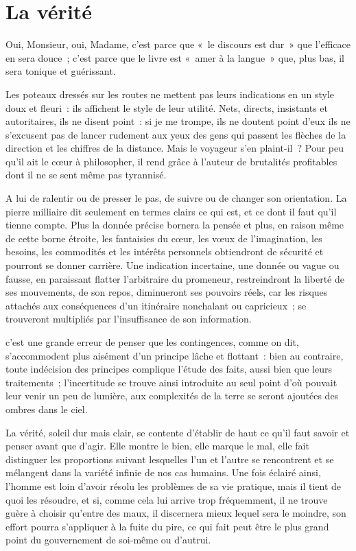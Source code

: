 \documentclass[french,twoside]{book} %
\begin{document}
\section[{La vérité}]{La vérité}
\noindent Oui, Monsieur, oui, Madame, c’est parce que « le discours est dur » que l’efficace en sera douce ; c’est parce que le livre est « amer à la langue » que, plus bas, il sera tonique et guérissant.\par
Les poteaux dressés sur les routes ne mettent pas leurs indications en un style doux et fleuri : ils affichent le style de leur utilité. Nets, directs, insistants et autoritaires, ils ne disent point : si je me trompe, ils ne doutent point d’eux ils ne s’excusent pas de lancer rudement aux yeux des gens qui passent les flèches de la direction et les chiffres de la distance. Mais le voyageur s’en plaint-il ? Pour peu qu’il ait le cœur à philosopher, il rend grâce à l’auteur de brutalités profitables dont il ne se sent même pas tyrannisé.\par
A lui de ralentir ou de presser le pas, de suivre ou de changer son orientation. La pierre milliaire dit seulement en termes clairs ce qui est, et ce dont il faut qu’il tienne compte. Plus la donnée précise bornera la pensée et plus, en raison même de cette borne étroite, les fantaisies du cœur, les vœux de l’imagination, les besoins, les commodités et les intérêts personnels obtiendront de sécurité et pourront se donner carrière. Une indication incertaine, une donnée ou vague ou fausse, en paraissant flatter l’arbitraire du promeneur, restreindront la liberté de ses mouvements, de son repos, diminueront ses pouvoirs réels, car les risques attachés aux conséquences d’un itinéraire nonchalant ou capricieux ; se trouveront multipliés par l’insuffisance de son information.\par
c’est une grande erreur de penser que les contingences, comme on dit, s’accommodent plus aisément d’un principe lâche et flottant : bien au contraire, toute indécision des principes complique l’étude des faits, aussi bien que leurs traitements ; l’incertitude se trouve ainsi introduite au seul point d’où pouvait leur venir un peu de lumière, aux complexités de la terre se seront ajoutées des ombres dans le ciel.\par
La vérité, soleil dur mais clair, se contente d’établir de haut ce qu’il faut savoir et penser avant que d’agir. Elle montre le bien, elle marque le mal, elle fait distinguer les proportions suivant lesquelles l’un et l’autre se rencontrent et se mélangent dans la variété infinie de nos cas humains. Une fois éclairé ainsi, l’homme est loin d’avoir résolu les problèmes de sa vie pratique, mais il tient de quoi les résoudre, et si, comme cela lui arrive trop fréquemment, il ne trouve guère à choisir qu’entre des maux, il discernera mieux lequel sera le moindre, son effort pourra s’appliquer à la fuite du pire, ce qui fait peut être le plus grand point du gouvernement de soi-même ou d’autrui.\par
\end{document}
